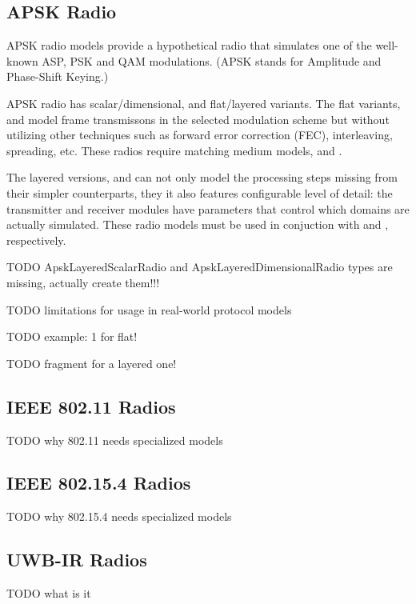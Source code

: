 \subsection{APSK Radio}

APSK radio models provide a hypothetical radio that simulates 
one of the well-known ASP, PSK and QAM modulations. 
(APSK stands for Amplitude and Phase-Shift Keying.)

APSK radio has scalar/dimensional, and flat/layered variants.
The flat variants,  and 
model frame transmissons in the selected modulation scheme
but without utilizing other techniques such as forward error 
correction (FEC), interleaving, spreading, etc. These radios
require matching medium models, 
and .

The layered versions,  
and  can not only
model the processing steps missing from their simpler counterparts,
they it also features configurable level of detail: the transmitter
and receiver modules have  parameters that 
control which domains are actually simulated.
These radio models must be used in conjuction with
 and 
, respectively.

TODO ApskLayeredScalarRadio and ApskLayeredDimensionalRadio types are missing, actually create them!!! 

TODO limitations for usage in real-world protocol models

TODO example: 1 for flat!

TODO fragment for a layered one!


\subsection{IEEE 802.11 Radios}

TODO why 802.11 needs specialized models 

\subsection{IEEE 802.15.4 Radios}

TODO why 802.15.4 needs specialized models 

\subsection{UWB-IR Radios}

TODO what is it



